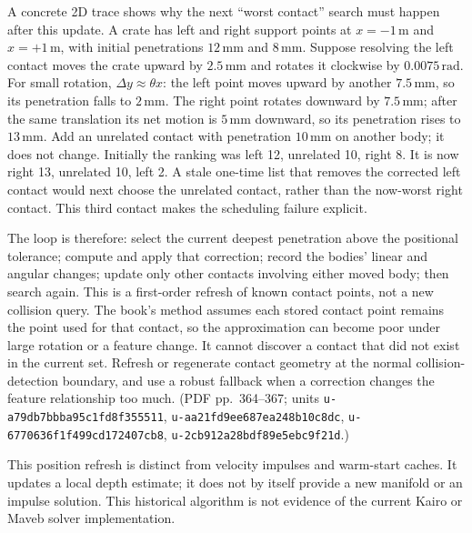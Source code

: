 A concrete 2D trace shows why the next ``worst contact'' search must happen after this update. A crate has left and right support points at \(x=-1\,\mathrm m\) and \(x=+1\,\mathrm m\), with initial penetrations \(12\,\mathrm{mm}\) and \(8\,\mathrm{mm}\). Suppose resolving the left contact moves the crate upward by \(2.5\,\mathrm{mm}\) and rotates it clockwise by \(0.0075\,\mathrm{rad}\). For small rotation, \(\Delta y\approx\theta x\): the left point moves upward by another \(7.5\,\mathrm{mm}\), so its penetration falls to \(2\,\mathrm{mm}\). The right point rotates downward by \(7.5\,\mathrm{mm}\); after the same translation its net motion is \(5\,\mathrm{mm}\) downward, so its penetration rises to \(13\,\mathrm{mm}\). Add an unrelated contact with penetration \(10\,\mathrm{mm}\) on another body; it does not change. Initially the ranking was left 12, unrelated 10, right 8. It is now right 13, unrelated 10, left 2. A stale one-time list that removes the corrected left contact would next choose the unrelated contact, rather than the now-worst right contact. This third contact makes the scheduling failure explicit.

The loop is therefore: select the current deepest penetration above the positional tolerance; compute and apply that correction; record the bodies' linear and angular changes; update only other contacts involving either moved body; then search again. This is a first-order refresh of known contact points, not a new collision query. The book's method assumes each stored contact point remains the point used for that contact, so the approximation can become poor under large rotation or a feature change. It cannot discover a contact that did not exist in the current set. Refresh or regenerate contact geometry at the normal collision-detection boundary, and use a robust fallback when a correction changes the feature relationship too much. (PDF pp.~364--367; units \texttt{u-a79db7bbba95c1fd8f355511}, \texttt{u-aa21fd9ee687ea248b10c8dc}, \texttt{u-6770636f1f499cd172407cb8}, \texttt{u-2cb912a28bdf89e5ebc9f21d}.)

This position refresh is distinct from velocity impulses and warm-start caches. It updates a local depth estimate; it does not by itself provide a new manifold or an impulse solution. This historical algorithm is not evidence of the current Kairo or Maveb solver implementation.

